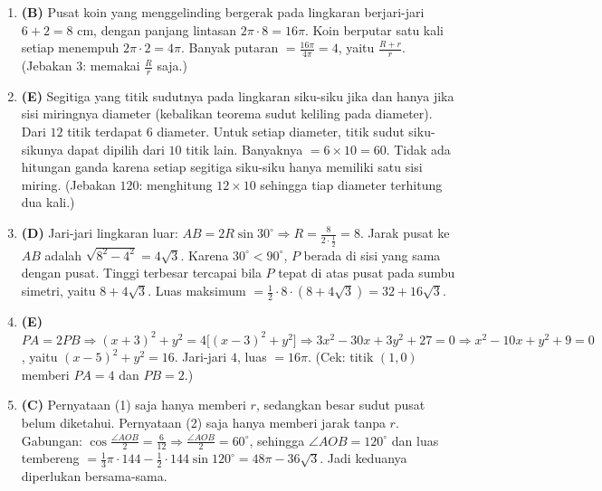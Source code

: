 \documentclass[a4paper,11pt]{article}
\newcommand{\dis}{\displaystyle}
\newcounter{no}
\begin{document}
\begin{enumerate}[leftmargin=2em,itemsep=2pt,topsep=2pt]
\item[\textbf{16.}] \textbf{(B)} Pusat koin yang menggelinding bergerak pada lingkaran berjari-jari $6+2=8$ cm, dengan panjang lintasan $2\pi\cdot8=16\pi$. Koin berputar satu kali setiap menempuh $2\pi\cdot2=4\pi$. Banyak putaran $=\dis\frac{16\pi}{4\pi}=4$, yaitu $\dis\frac{R+r}{r}$. (Jebakan $3$: memakai $\frac{R}{r}$ saja.)
\item[\textbf{17.}] \textbf{(E)} Segitiga yang titik sudutnya pada lingkaran siku-siku jika dan hanya jika sisi miringnya diameter (kebalikan teorema sudut keliling pada diameter). Dari $12$ titik terdapat $6$ diameter. Untuk setiap diameter, titik sudut siku-sikunya dapat dipilih dari $10$ titik lain. Banyaknya $=6\times10=60$. Tidak ada hitungan ganda karena setiap segitiga siku-siku hanya memiliki satu sisi miring. (Jebakan $120$: menghitung $12\times10$ sehingga tiap diameter terhitung dua kali.)
\item[\textbf{18.}] \textbf{(D)} Jari-jari lingkaran luar: $AB=2R\sin30^\circ\Rightarrow R=\dis\frac{8}{2\cdot\frac12}=8$. Jarak pusat ke $AB$ adalah $\sqrt{8^2-4^2}=4\sqrt3$. Karena $30^\circ<90^\circ$, $P$ berada di sisi yang sama dengan pusat. Tinggi terbesar tercapai bila $P$ tepat di atas pusat pada sumbu simetri, yaitu $8+4\sqrt3$. Luas maksimum $=\frac12\cdot8\cdot(8+4\sqrt3)=32+16\sqrt3$.
\item[\textbf{19.}] \textbf{(E)} $PA=2PB\Rightarrow(x+3)^2+y^2=4\big[(x-3)^2+y^2\big]\Rightarrow3x^2-30x+3y^2+27=0\Rightarrow x^2-10x+y^2+9=0$, yaitu $(x-5)^2+y^2=16$. Jari-jari $4$, luas $=16\pi$. (Cek: titik $(1,0)$ memberi $PA=4$ dan $PB=2$.)
\item[\textbf{20.}] \textbf{(C)} Pernyataan (1) saja hanya memberi $r$, sedangkan besar sudut pusat belum diketahui. Pernyataan (2) saja hanya memberi jarak tanpa $r$. Gabungan: $\cos\frac{\angle AOB}{2}=\dis\frac{6}{12}\Rightarrow\frac{\angle AOB}{2}=60^\circ$, sehingga $\angle AOB=120^\circ$ dan luas tembereng $=\frac13\pi\cdot144-\frac12\cdot144\sin120^\circ=48\pi-36\sqrt3$. Jadi keduanya diperlukan bersama-sama.
\end{enumerate}
\par{}\par\vspace{0.2em}
\end{document}
